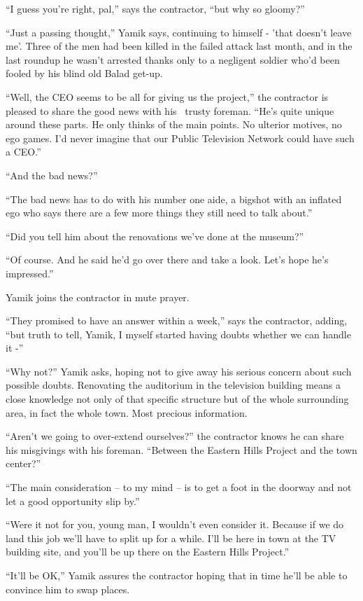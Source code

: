 \documentclass[twoside,11pt]{book}
\begin{document}
``I guess you're right, pal,'' says the contractor, ``but why so
gloomy?''

``Just a passing thought,'' Yamik says, continuing to himself - 'that doesn't leave me'. Three
of the men had been killed in the failed attack last month, and in the last roundup he wasn't arrested thanks only to a
negligent soldier who'd been fooled by his blind old Balad get-up.

``Well, the CEO seems to be all for giving us the project,'' the contractor is pleased to
share the good news with his \ trusty foreman. ``He's quite unique around these parts. He only thinks of
the main points. No ulterior motives, no ego games. I'd never imagine that our Public Television Network could have
such a CEO.''

``And the bad news?''

``The bad news has to do with his number one aide, a bigshot with an inflated ego who says there are a few
more things they still need to talk about.''

``Did you tell him about the renovations we've done at the museum?''

``Of course. And he said he'd go over there and take a look. Let's hope he's impressed.''

Yamik joins the contractor in mute prayer.

``They promised to have an answer within a week,'' says the contractor{,}
adding, ``but truth to tell, Yamik, I myself started having doubts whether we can handle it
-''

``Why not?'' Yamik asks, hoping not to give away his serious{ }concern about
such possible doubts. Renovating the auditorium in the television building means a close knowledge not only of that
specific structure but of the whole surrounding area, in fact the whole town. Most precious information. ~

``Aren't we going to over-extend ourselves?'' the contractor knows he can share his misgivings
with his foreman. ``Between the Eastern Hills Project and the town center?''

``The main consideration -- to my mind -- is to get a foot in the doorway and not let a good opportunity
slip by.''

``Were it not for you, young man, I wouldn't even consider it. Because if we do land this job we'll have to
split up for a while. I'll be here in town at the TV building site, and you'll be up there on the Eastern Hills
Project.''

``It'll be OK,'' Yamik assures the contractor hoping that in time he'll be able to convince
him to swap places. ~
\end{document}
